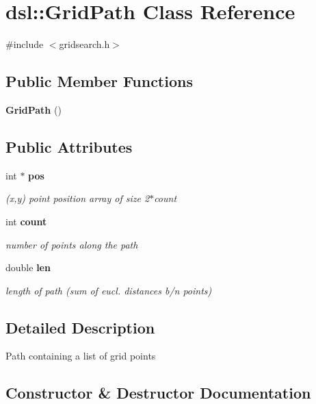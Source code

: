 \section{dsl\-:\-:Grid\-Path Class Reference}
\label{classdsl_1_1GridPath}


{\ttfamily \#include $<$gridsearch.\-h$>$}

\subsection*{Public Member Functions}
\begin{DoxyCompactItemize}
\item 
{\bf Grid\-Path} ()
\end{DoxyCompactItemize}
\subsection*{Public Attributes}
\begin{DoxyCompactItemize}
\item 
int $\ast$ {\bf pos}
\begin{DoxyCompactList}\small\item\em (x,y) point position array of size 2$\ast$count \end{DoxyCompactList}\item 
int {\bf count}
\begin{DoxyCompactList}\small\item\em number of points along the path \end{DoxyCompactList}\item 
double {\bf len}
\begin{DoxyCompactList}\small\item\em length of path (sum of eucl. distances b/n points) \end{DoxyCompactList}\end{DoxyCompactItemize}


\subsection{Detailed Description}
Path containing a list of grid points 

\subsection{Constructor \& Destructor Documentation}
